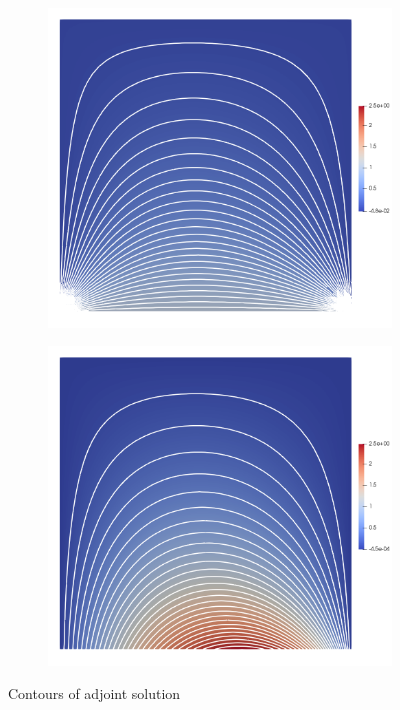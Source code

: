 \documentclass[a4paper]{article}
\begin{document}
\begin{figure}[!htbp]
	\centering
	\begin{subfigure}{0.45\textwidth}
		\centering
		\includegraphics[width=1.0\linewidth]{figures/adj_soln_beta1.png}
		\label{fig:adjsln_beta1}
	\end{subfigure}
	\begin{subfigure}{0.45\textwidth}
		\centering
		\includegraphics[width=1.0\linewidth]{figures/adj_soln_beta2.png}
		\label{fig:adjsln_beta2}
	\end{subfigure}
	\caption{Contours of adjoint solution} 
	\label{fig:adj_contours}
\end{figure}





\end{document}
